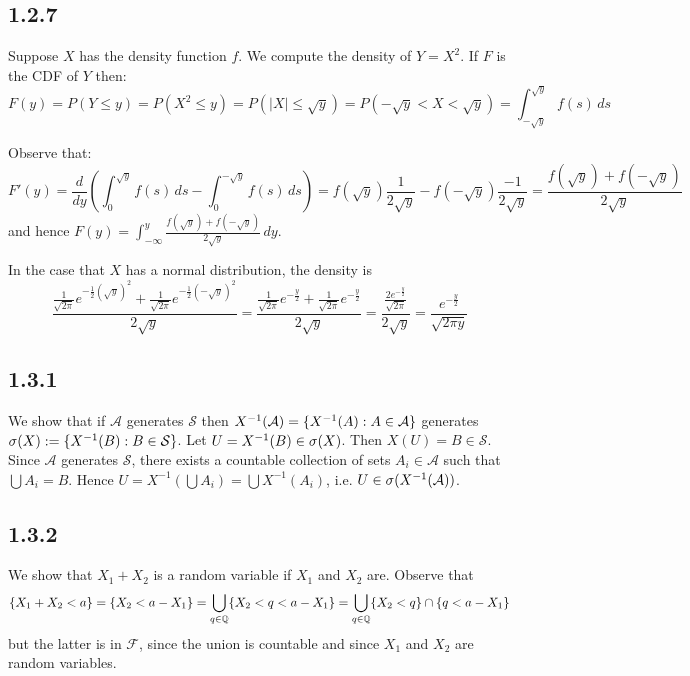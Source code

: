 \documentclass[11pt]{article}
\begin{document}
\subsection*{1.2.7}

Suppose $X$ has the density function $f$. We compute the density of $Y=X^2$. If $F$ is the CDF of $Y$ then: \[F(y) = P(Y\leq y) = P(X^2 \leq y) = P(|X| \leq \sqrt{y}) = P(-\sqrt{y} < X < \sqrt{y}) = \int_{-\sqrt{y}}^{\sqrt{y}} f(s) \,ds\] 

Observe that: \[F'(y) = \frac{d}{dy}\left(\int_{0}^{\sqrt{y}} f(s) \,ds - \int_{0}^{-\sqrt{y}} f(s) \,ds\right) = f(\sqrt{y})\frac{1}{2\sqrt{y}} - f(-\sqrt{y})\frac{-1}{2\sqrt{y}}= \frac{f(\sqrt{y})+f(-\sqrt{y})}{2\sqrt{y}}\] and hence $F(y) = \int_{-\infty}^y \frac{f(\sqrt{y})+f(-\sqrt{y})}{2\sqrt{y}}\,dy$. 

In the case that $X$ has a normal distribution, the density is \[\frac{\frac{1}{\sqrt{2\pi}} e^{-\frac12 (\sqrt{y})^2} + \frac{1}{\sqrt{2\pi}} e^{-\frac12 (-\sqrt{y})^2}}{2\sqrt{y}} = \frac{\frac{1}{\sqrt{2\pi}} e^{-\frac{y}{2}} + \frac{1}{\sqrt{2\pi}} e^{-\frac{y}{2}}}{2\sqrt{y}}=\frac{\frac{2e^{-\frac{y}{2}}}{\sqrt{2\pi}}}{2\sqrt{y}}=\frac{e^{-\frac{y}{2}}}{\sqrt{2\pi y}}\]

\subsection*{1.3.1}

We show that if $\mathcal{A}$ generates $\mathcal{S}$ then $X^{-1}(\mathcal{A}) = \{X^{-1}(A): A \in \mathcal{A}\}$ generates $\sigma(X) := \{X^{-1}(B) : B \in \mathcal{S}\}$. Let $U = X^{-1}(B)\in \sigma(X)$. Then $X(U) = B \in \mathcal{S}$. Since $\mathcal{A}$ generates $\mathcal{S}$, there exists a countable collection of sets $A_i \in \mathcal{A}$ such that $\bigcup A_i = B$. Hence $U = X^{-1} (\bigcup A_i) = \bigcup X^{-1}(A_i)$, i.e. $U \in \sigma(X^{-1}(\mathcal{A}))$.

\subsection*{1.3.2}

We show that $X_1 + X_2$ is a random variable if $X_1$ and $X_2$ are. Observe that \[\{X_1 + X_2 < a\} = \{X_2 < a - X_1\} = \bigcup_{q \in {\mathbb Q}} \{X_2 < q < a - X_1\} = \bigcup_{q \in {\mathbb Q}}  \{X_2 < q\} \cap \{q < a - X_1\} \] but the latter is in $\mathcal{F}$, since the union is countable and since $X_1$ and $X_2$ are random variables.
\end{document}
